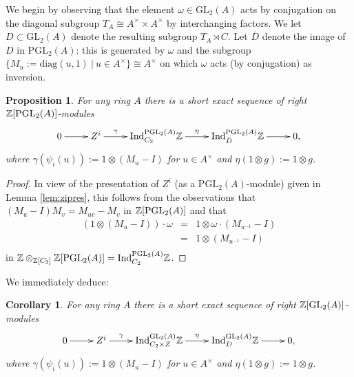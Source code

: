 \documentclass[12pt]{amsart}
\newtheorem{prop}[lem]{Proposition}
\newtheorem{cor}[lem]{Corollary}
\theoremstyle{definition}
\newcommand{\Z}{\Bbb{Z}}
\newcommand{\gl}[2]{\mathrm{GL}_{#1}(#2)}
\newcommand{\pgl}[2]{\mathrm{PGL}_{#1}(#2)}
\newcommand{\suss}[2]{\psi_{#1}\left( #2\right)}
\newcommand{\<}{\langle}
\renewcommand{\>}{\rangle}
\renewcommand{\ker}[1]{\mathrm{Ker}(#1)}
\newcommand{\coker}[1]{\mathrm{Coker}\left(#1\right)}
\newcommand{\ho}[3]{\mathrm{H}_{#1}\left( #2,#3 \right)}
\newcommand{\Ind}[3]{\mathrm{Ind}_{#1}^{#2}#3}
\begin{document}
We begin by observing that the element $\omega\in \gl{2}{A}$ acts by conjugation on the diagonal subgroup $T_A\cong A^\times\times A^\times$ by interchanging factors. We let 
$D\subset \gl{2}{A}$ denote the resulting subgroup $T_A\rtimes C$. Let $\bar{D}$ denote the image of $D$ in $\pgl{2}{A}$: this is generated by $\omega$ and the subgroup
$\{ M_u:=\mathrm{diag}(u,1)\ |\ u\in A^\times\}\cong A^\times$ on which $\omega$ acts (by conjugation) as inversion.

\begin{prop}\label{prop:zises} For any ring $A$ there is a short exact sequence of right $\Z[\pgl{2}{A}]$-modules
\[
\xymatrix{
0\ar[r] &Z^i\ar^-{\gamma}[r]& \Ind{C_2}{\pgl{2}{A}}{\Z}\ar^-{\eta}[r]&\Ind{\bar{D}}{\pgl{2}{A}}{\Z}\ar[r]&0,
}
\]
where $\gamma(\suss{i}{u}):=1\otimes(M_u-I)$ for $u\in A^\times$ and $\eta(1\otimes g):=1\otimes g$.
\end{prop}

\begin{proof} In view of the presentation of $Z^i$ (as a $\pgl{2}{A}$-module) given in Lemma \ref{lem:zipres}, this follows from the observations that 
$(M_u-I)M_v= M_{uv}-M_v$ in $\Z[\pgl{2}{A}]$ and that 
\begin{eqnarray*}
(1\otimes (M_u-I))\cdot \omega&=&1\otimes \omega\cdot (M_{u^{-1}}-I)\\ 
&=&1\otimes (M_{u^{-1}}-I)\\
\end{eqnarray*}
in $\Z\otimes_{\Z[C_2]}\Z[\pgl{2}{A}]=\Ind{C_2}{\pgl{2}{A}}{\Z}$.
\end{proof}


We immediately deduce:
\begin{cor}\label{cor:zises}  For any ring $A$ there is a short exact sequence of right $\Z[\gl{2}{A}]$-modules
\[
\xymatrix{
0\ar[r] &Z^i\ar^-{\gamma}[r]& \Ind{C_2\times Z}{\gl{2}{A}}{\Z}\ar^-{\eta}[r]&\Ind{{D}}{\gl{2}{A}}{\Z}\ar[r]&0,
}
\]
where $\gamma(\suss{i}{u}):=1\otimes(M_u-I)$ for $u\in A^\times$ and $\eta(1\otimes g):=1\otimes g$.
\end{cor}
\end{document}
